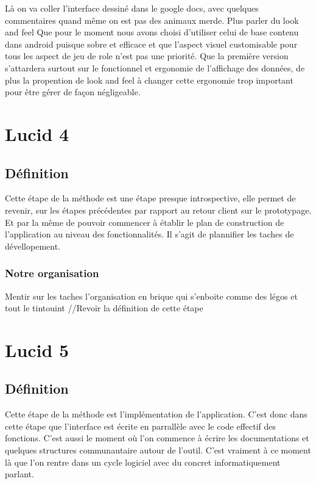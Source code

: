 \documentclass[11pt,a4paper]{report}
\begin{document}
Là on va coller l'interface dessiné dans le google docs, avec quelques
commentaires quand même on est pas des animaux merde.
Plus parler du look and feel
Que pour le moment nous avons choisi d'utiliser celui de base contenu dans
android puisque sobre et efficace et que l'aspect visuel customisable pour tous
les aspect de jeu de role n'est pas une priorité. Que la première version
s'attardera surtout sur le fonctionnel et ergonomie de l'affichage des données,
de plus la propention de look and feel à changer cette ergonomie trop important
pour être gérer de façon négligeable.

\section{Lucid 4}

\subsection{Définition}

Cette étape de la méthode est une étape presque introspective, elle permet de
revenir, sur les étapes précédentes par rapport au retour client sur le
prototypage. Et par la même de pouvoir commencer à établir le plan de
construction de l'application au niveau des fonctionnalités. Il s'agit de
plannifier les taches de dévellopement. 

\subsubsection{Notre organisation}

Mentir sur les taches l'organisation en brique qui s'enboite comme des légos et
tout le tintouint
//Revoir la définition de cette étape


\clearpage

\section{Lucid 5}

\subsection{Définition}

Cette étape de la méthode est l'implémentation de l'application. C'est donc dans
cette étape que l'interface est écrite en parrallèle avec le code effectif des
fonctions. C'est aussi le moment où l'on commence à écrire les documentations et
quelques structures communautaire autour de l'outil. C'est vraiment à ce moment
là que l'on rentre dans un cycle logiciel avec du concret informatiquement
parlant.
\end{document}
